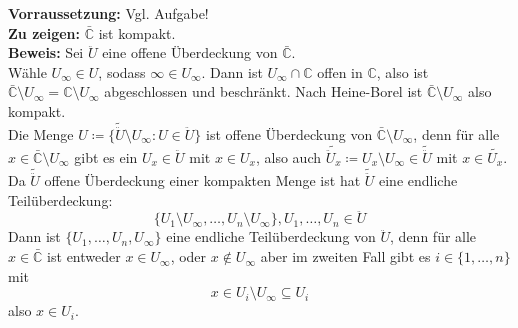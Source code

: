 \begin{problem*}[2]
  \textbf{Vorraussetzung:} Vgl. Aufgabe! \\
  \textbf{Zu zeigen:} \( \bar{\mathbb{C}} \) ist kompakt. \\
  \textbf{Beweis:} Sei \( \ddot{U} \) eine offene Überdeckung von \( \bar{\mathbb{C}} \). \\
  Wähle \( U_{\infty} \in U \), sodass \( \infty \in U_{\infty} \). Dann ist \( U_{\infty} \cap \mathbb{C} \) offen in \( \mathbb{C} \), also ist \( \bar{\mathbb{C}} \setminus U_{\infty} = \mathbb{C} \setminus U_{\infty} \) abgeschlossen und beschränkt. Nach Heine-Borel ist \( \bar{\mathbb{C}} \setminus U_{\infty} \) also kompakt. \\
  Die Menge \( U \coloneqq \{ \tilde{\ddot{U}} \setminus U_{\infty} : U \in \ddot{U} \} \) ist offene Überdeckung von \( \bar{\mathbb{C}} \setminus U_{\infty} \), denn für alle \( x \in \bar{\mathbb{C}} \setminus U_{\infty} \) gibt es ein \( U_x \in \ddot{U} \) mit \( x \in U_x \), also auch \( \tilde{\ddot{U}_x} \coloneqq U_x \setminus U_{\infty} \in \tilde{\ddot{U}} \) mit \( x \in \tilde{U_x}. \) \\
  Da \( \tilde{\ddot{U}} \) offene Überdeckung einer kompakten Menge ist hat \( \tilde{\ddot{U}} \) eine endliche Teilüberdeckung: 
  \begin{equation*}
    \{ U_1 \setminus U_{\infty}, \dots, U_n \setminus U_{\infty} \}, U_1, \dots, U_n \in \ddot{U}
  \end{equation*}
  Dann ist \( \{ U_1, \dots, U_n, U_{\infty} \} \) eine endliche Teilüberdeckung von \( \ddot{U} \), denn für alle
  \( x \in \bar{\mathbb{C}} \) ist entweder \( x \in U_{\infty} \), oder \( x \notin U_{\infty} \) aber im zweiten Fall gibt es \( i \in \{ 1, \dots, n \} \) mit 
  \begin{equation*}
    x \in U_i \setminus U_{\infty} \subseteq U_i
  \end{equation*} 
  also \( x \in U_i \).
\end{problem*}
